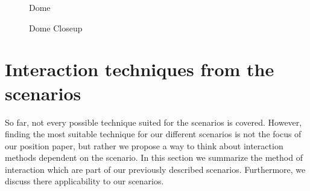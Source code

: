 \documentclass[review,journal]{vgtc}         %
\begin{document}
\begin{figure}[htb]
	\centering
	\caption{Dome}
	\label{img:dome_clip}
\end{figure}

\begin{figure}[htb]
	\centering
	\caption{Dome Closeup}
	\label{img:dome_tf_change}
\end{figure}

\section{Interaction techniques from the scenarios}

So far, not every possible technique suited for the scenarios is covered. However, finding the most suitable technique for our different scenarios is not the focus of our position paper, but rather we propose a way to think about interaction methods dependent on the scenario. In this section we summarize the method of interaction which are part of our previously described scenarios. Furthermore, we discuss there applicability to our scenarios.
\end{document}
